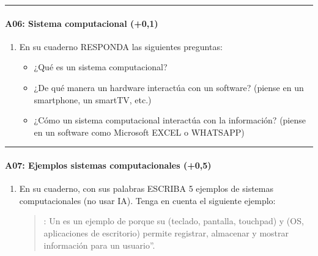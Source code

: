 \documentclass[letterpaper,10pt,spanish]{sphinxmanual}
\begin{document}
\bigskip\hrule\bigskip



\paragraph{A06: Sistema computacional (+0,1)}
\label{\detokenize{cursos/logica8/periodo01/G01:a06-sistema-computacional-0-1}}
\sphinxAtStartPar
{}
\begin{enumerate}
%
\item {} 
\sphinxAtStartPar
En su cuaderno RESPONDA las siguientes preguntas:
\begin{itemize}
\item {} 
\sphinxAtStartPar
¿Qué es un sistema computacional?

\item {} 
\sphinxAtStartPar
¿De qué manera un hardware interactúa con un software? (piense en un smartphone, un smart\sphinxhyphen{}TV, etc.)

\item {} 
\sphinxAtStartPar
¿Cómo un sistema computacional interactúa con la información? (piense en un software como Microsoft EXCEL o WHATSAPP)

\end{itemize}

\end{enumerate}


\bigskip\hrule\bigskip



\paragraph{A07: Ejemplos sistemas computacionales (+0,5)}
\label{\detokenize{cursos/logica8/periodo01/G01:a07-ejemplos-sistemas-computacionales-0-5}}
\sphinxAtStartPar
{}
\begin{enumerate}
%
\item {} 
\sphinxAtStartPar
En su cuaderno, con sus palabras ESCRIBA 5 ejemplos de sistemas computacionales (no usar IA). Tenga en cuenta el siguiente ejemplo:
\begin{quote}

\sphinxAtStartPar
{}: Un  es un ejemplo de  porque su  (teclado, pantalla, touchpad) y  (OS, aplicaciones de escritorio) permite registrar, almacenar y mostrar información para un usuario”.
\end{quote}

\end{enumerate}
\end{document}
